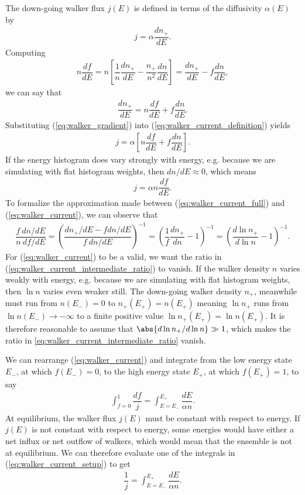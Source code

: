 \documentclass[11pt]{article}
\newcommand{\f}[2]{\dfrac{#1}{#2}} %
\newcommand{\p}[1]{\left(#1\right)} %
\renewcommand{\sp}[1]{\left[#1\right]} %
\begin{document}
The down-going walker flux $j\p{E}$ is defined in terms of the
diffusivity $\alpha\p{E}$ by
\begin{align}
  j=\alpha\f{dn_+}{dE}.
  \label{eq:walker_current_definition}
\end{align}
Computing
\begin{align}
  n\f{df}{dE}=n\sp{\f1{n}\f{dn_+}{dE}-\f{n_+}{n^2}\f{dn}{dE}}
  =\f{dn_+}{dE}-f\f{dn}{dE},
  \label{eq:walker_intermediate}
\end{align}
we can say that
\begin{align}
  \f{dn_+}{dE}=n\f{df}{dE}+f\f{dn}{dE}.
  \label{eq:walker_gradient}
\end{align}
Substituting (\ref{eq:walker_gradient}) into
(\ref{eq:walker_current_definition}) yields
\begin{align}
  j=\alpha\sp{n\f{df}{dE}+f\f{dn}{dE}}.
  \label{eq:walker_current_full}
\end{align}
If the energy histogram does vary strongly with energy, e.g. because
we are simulating with flat histogram weights, then $dn/dE\approx0$,
which means
\begin{align}
  j=\alpha n\f{df}{dE}.
  \label{eq:walker_current}
\end{align}
To formalize the approximation made between
(\ref{eq:walker_current_full}) and (\ref{eq:walker_current}), we can
observe that
\begin{align}
  \f{f~dn/dE}{n~df/dE}
  =\p{\f{dn_+/dE-fdn/dE}{f~dn/dE}}^{-1}=\p{\f1f\f{dn_+}{dn}-1}^{-1}
  =\p{\f{d\ln n_+}{d\ln n}-1}^{-1}.
  \label{eq:walker_current_intermediate_ratio}
\end{align}
For (\ref{eq:walker_current}) to be a valid, we want the ratio in
(\ref{eq:walker_current_intermediate_ratio}) to vanish. If the walker
density $n$ varies weakly with energy, e.g. because we are simulating
with flat histogram weights, then $\ln n$ varies even weaker
still. The down-going walker density $n_+$, meanwhile must run from
$n\p{E_-}=0$ to $n_+\p{E_+}=n\p{E_+}$ meaning $\ln n_+$ runs from $\ln
n\p{E_-}\to-\infty$ to a finite positive value $\ln n_+\p{E_+}=\ln
n\p{E_+}$. It is therefore reasonable to assume that $\abs{d\ln
  n_+/d\ln n}\gg 1$, which makes the ratio in
\ref{eq:walker_current_intermediate_ratio} vanish.

We can rearrange (\ref{eq:walker_current}) and integrate from the low
energy state $E_-$, at which $f\p{E_-}=0$, to the high energy state
$E_+$, at which $f\p{E_+}=1$, to say
\begin{align}
  \int_{f=0}^1\f{df}{j}=\int_{E=E_-}^{E_+}\f{dE}{\alpha n}.
  \label{eq:walker_current_setup}
\end{align}
At equilibrium, the walker flux $j\p{E}$ must be constant with respect
to energy. If $j\p{E}$ is not constant with respect to energy, some
energies would have either a net influx or net outflow of walkers,
which would mean that the ensemble is not at equilibrium. We can
therefore evaluate one of the integrals in
(\ref{eq:walker_current_setup}) to get
\begin{align}
  \f1j=\int_{E=E_-}^{E_+}\f{dE}{\alpha n}.
  \label{eq:walker_current_integral}
\end{align}
\end{document}
